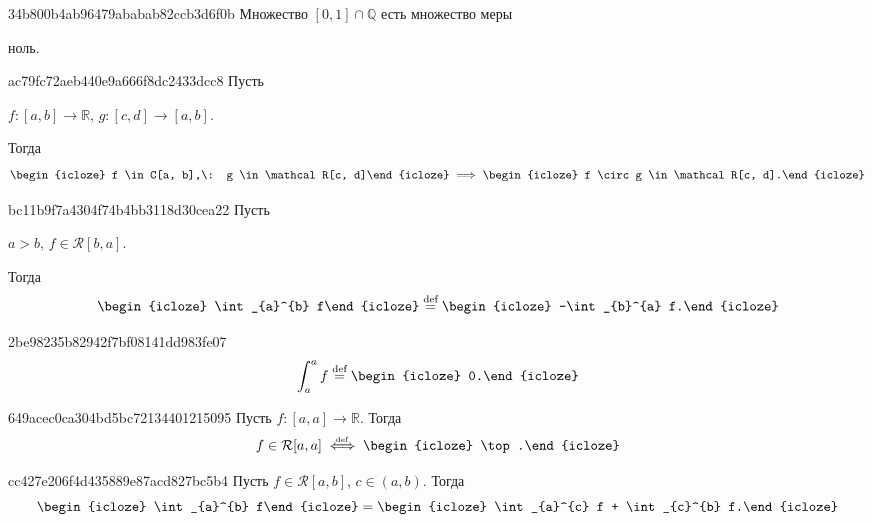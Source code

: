 \begin{note}{34b800b4ab96479ababab82ccb3d6f0b}
    Множество \({ [0, 1] \cap \mathbb Q }\) есть множество меры \begin{icloze}{1}ноль.\end{icloze}
\end{note}

\begin{note}{ac79fc72aeb440e9a666f8dc2433dcc8}
    Пусть \begin{icloze}{3}\({ f : [a, b] \to \mathbb R }\), \({ g : [c, d] \to [a, b] }\).\end{icloze}
    Тогда
    \[
        \begin{icloze}{2}f \in C[a, b],\:  g \in \mathcal R[c, d]\end{icloze} \implies \begin{icloze}{1}f \circ g \in \mathcal R[c, d].\end{icloze}
    \]
\end{note}

\begin{note}{bc11b9f7a4304f74b4bb3118d30cea22}
    Пусть \begin{icloze}{3}\({ a > b }\), \({ f \in \mathcal R[b, a] }\).\end{icloze} Тогда
    \[
        \begin{icloze}{2}\int_{a}^{b} f\end{icloze} \overset{\text{def}}= \begin{icloze}{1}-\int_{b}^{a} f.\end{icloze}
    \]
\end{note}

\begin{note}{2be98235b82942f7bf08141dd983fe07}
    \[
        \int_{a}^{a} f \overset{\text{def}}= \begin{icloze}{1}0.\end{icloze}
    \]
\end{note}

\begin{note}{649acec0ca304bd5bc72134401215095}
    Пусть \({ f : [a, a] \to \mathbb R }\). Тогда
    \[
        f \in \mathcal R[a, a] \overset{\hspace{-1pt}\text{\tiny def}}\iff \begin{icloze}{1}\top.\end{icloze}
    \]
\end{note}

\begin{note}{cc427e206f4d435889e87acd827bc5b4}
    Пусть \({ f \in \mathcal R[a, b] }\),  \({ c \in (a, b) }\).
    Тогда
    \[
        \begin{icloze}{2}\int_{a}^{b} f\end{icloze} = \begin{icloze}{1}\int_{a}^{c} f + \int_{c}^{b} f.\end{icloze}
    \]
\end{note}

